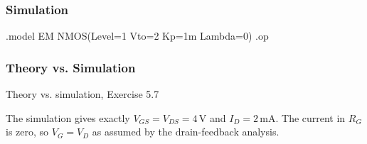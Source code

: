 \subsubsection*{Simulation}
\begin{spice}
.model EM NMOS(Level=1 Vto=2 Kp=1m Lambda=0)
.op
\end{spice}

\subsubsection*{Theory vs. Simulation}
\begin{comparison}{Theory vs. simulation, Exercise 5.7}
\end{comparison}
\begin{solution}
The simulation gives exactly $V_{GS} = V_{DS} = 4$\,V and $I_D = 2$\,mA. The current in $R_G$ is zero, so $V_G = V_D$
as assumed by the drain-feedback analysis.
\end{solution}
